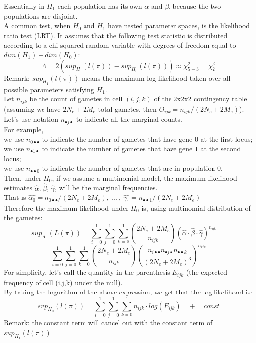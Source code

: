 \documentclass[a4paper,12pt]{article}
\begin{document}
 \noindent Essentially in $H_{1}$ each population has its own $\alpha$ and $\beta$, because the two populations are disjoint.\\
 
 A common test, when $H_0$ and $H_1$ have nested parameter spaces, is the likelihood ratio test (LRT). It assumes that the following test statistic is distributed according to a chi squared random variable with degrees of freedom equal to $dim(H_1) - dim(H_0)$:
 $$\Lambda = 2(sup_{H_1}(l(\pi)) - sup_{H_0}(l(\pi)) ) \approx \chi^2_{5-3} = \chi^2_{2}  $$
 Remark: $sup_{H_1}(l(\pi))$ means the maximum log-likelihood taken over all possible parameters satisfying $H_1$.\\
 
Let $n_{ijk}$ be the count of gametes in cell $(i,j,k)$ of the 2x2x2 contingency table (assuming we have $2N_e + 2M_e$ total gametes, then $O_{ijk} = n_{ijk}/(2N_e + 2M_e)$).\\
Let's use notation $n_{\bullet j \bullet}$ to indicate all the marginal counts.\\
For example, \\
\noindent we use   $n_{0 \bullet  \bullet}$ to indicate the number of gametes that have gene 0 at the first locus;\\
\noindent we use   $n_{\bullet 1 \bullet}$ to indicate the number of gametes that have gene 1 at the second locus;\\
\noindent we use  $n_{\bullet  \bullet 0}$ to indicate the number of gametes that are in population 0.\\
 
 Then, under $H_0$, if we assume a multinomial model, the maximum likelihood estimates $\hat{\alpha}$, $\hat{\beta}$, $\hat{\gamma}$, will be the marginal frequencies. \\
 \noindent That is $\hat{\alpha_0} = n_{0 \bullet  \bullet}/(2N_e + 2M_e), \:... \:, \: 
\hat{\gamma_1} = n_{ \bullet  \bullet 1}/(2N_e + 2M_e) $\\

\noindent Therefore the maximum likelihood under $H_0$ is, using multinomial distribution of the gametes:\\
$$sup_{H_0}(L(\pi)) = \sum_{i = 0}^1  \sum_{j = 0}^1  \sum_{k = 0}^1 {2N_e + 2M_e \choose n_{ijk}} (\hat{\alpha} \cdot \hat{\beta} \cdot \hat{\gamma})^{n_{ijk}} = $$
 $$\sum_{i = 0}^1  \sum_{j = 0}^1  \sum_{k = 0}^1 {2N_e + 2M_e \choose n_{ijk}}(\frac{n_{i \bullet  \bullet}
 n_{ \bullet j \bullet}n_{\bullet  \bullet k}}{(2N_e + 2M_e)^3}) ^ {n_{ijk}}$$
 For simplicity, let's call the quantity in the parenthesis $E_{ijk}$ (the expected frequency of cell (i,j,k) under the null).\\
 By taking the logarithm of the above expression, we get that the log likelihood is:
 $$sup_{H_0}(l(\pi)) = \sum_{i = 0}^1  \sum_{j = 0}^1  \sum_{k = 0}^1 n_{ijk}\cdot log(E_{ijk}) \quad + \quad const$$
 Remark: the constant term will cancel out with the constant term of $sup_{H_1}(l(\pi))$\\
 
\end{document}
